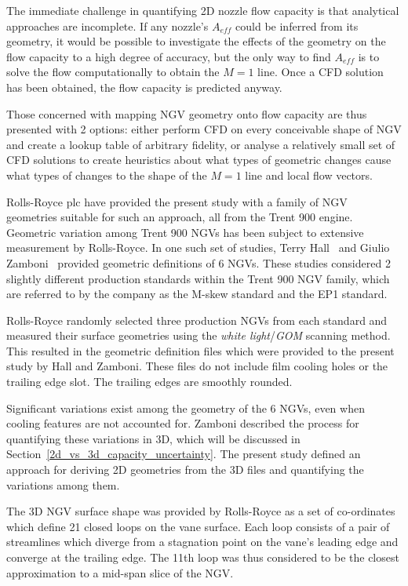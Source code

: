 \documentclass[a4paper, 11pt, twoside]{report}
\begin{document}
The immediate challenge in quantifying 2D nozzle flow capacity is that analytical approaches are incomplete. If any nozzle's $A_{eff}$ could be inferred from its geometry, it would be possible to investigate the effects of the geometry on the flow capacity to a high degree of accuracy, but the only way to find $A_{eff}$ is to solve the flow computationally to obtain the $M=1$ line. Once a CFD solution has been obtained, the flow capacity is predicted anyway.

Those concerned with mapping NGV geometry onto flow capacity are thus presented with 2 options: either perform CFD on every conceivable shape of NGV and create a lookup table of arbitrary fidelity, or analyse a relatively small set of CFD solutions to create heuristics about what types of geometric changes cause what types of changes to the shape of the $M=1$ line and local flow vectors.

Rolls-Royce plc have provided the present study with a family of NGV geometries suitable for such an approach, all from the Trent 900 engine. Geometric variation among Trent 900 NGVs has been subject to extensive measurement by Rolls-Royce. In one such set of studies, Terry Hall~\cite{hall_area} and Giulio Zamboni~\cite{zamboni_area} provided geometric definitions of 6 NGVs. These studies considered 2 slightly different production standards within the Trent 900 NGV family, which are referred to by the company as the M-skew standard and the EP1 standard.

Rolls-Royce randomly selected three production NGVs from each standard and measured their surface geometries using the \textit{white light}/\textit{GOM} scanning method. This resulted in the geometric definition files which were provided to the present study by Hall and Zamboni. These files do not include film cooling holes or the trailing edge slot. The trailing edges are smoothly rounded.

Significant variations exist among the geometry of the 6 NGVs, even when cooling features are not accounted for. Zamboni described the process for quantifying these variations in 3D, which will be discussed in Section~\ref{2d_vs_3d_capacity_uncertainty}. The present study defined an approach for deriving 2D geometries from the 3D files and quantifying the variations among them.

The 3D NGV surface shape was provided by Rolls-Royce as a set of co-ordinates which define 21 closed loops on the vane surface. Each loop consists of a pair of streamlines which diverge from a stagnation point on the vane's leading edge and converge at the trailing edge. The 11th loop was thus considered to be the closest approximation to a mid-span slice of the NGV.
\end{document}

